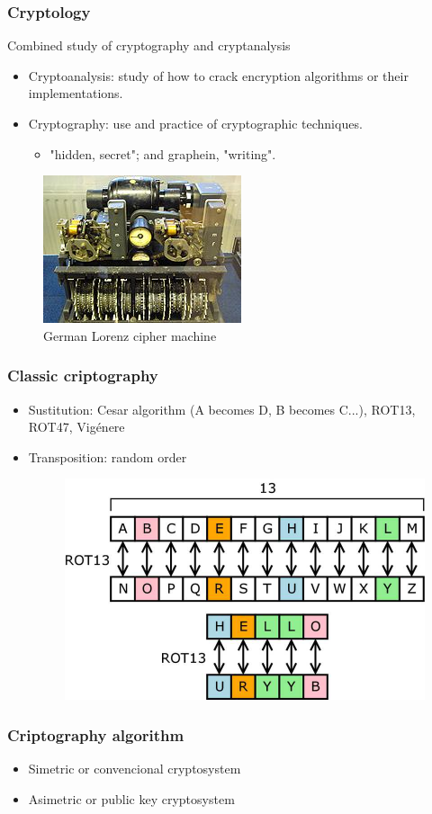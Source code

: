 \documentclass{beamer}
\begin{document}
\begin{frame}
\frametitle{Cryptology}
Combined study of cryptography and cryptanalysis
\begin{itemize}
\item Cryptoanalysis: study of how to crack encryption algorithms or their implementations.
\item Cryptography: use and practice of cryptographic techniques.
\begin{itemize}
\item "hidden, secret"; and graphein, "writing".
\end{itemize}
\end{itemize}
\begin{figure}
\includegraphics[width=0.3\linewidth]{ww2.jpg}
\caption{German Lorenz cipher machine}
\label{F:German Lorenz cipher machine}
\end{figure}
\end{frame}

\begin{frame}
\frametitle{Classic criptography}
\begin{itemize}
\item Sustitution: Cesar algorithm (A becomes D, B becomes C...), ROT13, ROT47, Vigénere 
\item Transposition: random order
\begin{figure}
\includegraphics[width=0.6\linewidth]{rot13.png}
\end{figure}
\end{itemize}
\end{frame}

\begin{frame}
\frametitle{Criptography algorithm}
\begin{itemize}
\item Simetric or convencional cryptosystem
\item Asimetric or public key cryptosystem
\end{itemize}
\end{frame}
\end{document}
